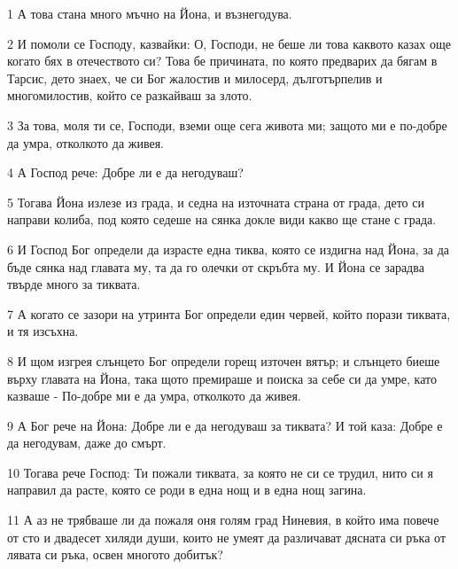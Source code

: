 \par 1 А това стана много мъчно на Йона, и възнегодува.
\par 2 И помоли се Господу, казвайки: О, Господи, не беше ли това каквото казах още когато бях в отечеството си? Това бе причината, по която предварих да бягам в Тарсис, дето знаех, че си Бог жалостив и милосерд, дълготърпелив и многомилостив, който се разкайваш за злото.
\par 3 За това, моля ти се, Господи, вземи още сега живота ми; защото ми е по-добре да умра, отколкото да живея.
\par 4 А Господ рече: Добре ли е да негодуваш?
\par 5 Тогава Йона излезе из града, и седна на източната страна от града, дето си направи колиба, под която седеше на сянка докле види какво ще стане с града.
\par 6 И Господ Бог определи да израсте една тиква, която се издигна над Йона, за да бъде сянка над главата му, та да го олечки от скръбта му. И Йона се зарадва твърде много за тиквата.
\par 7 А когато се зазори на утринта Бог определи един червей, който порази тиквата, и тя изсъхна.
\par 8 И щом изгрея слънцето Бог определи горещ източен вятър; и слънцето биеше върху главата на Йона, така щото премираше и поиска за себе си да умре, като казваше - По-добре ми е да умра, отколкото да живея.
\par 9 А Бог рече на Йона: Добре ли е да негодуваш за тиквата? И той каза: Добре е да негодувам, даже до смърт.
\par 10 Тогава рече Господ: Ти пожали тиквата, за която не си се трудил, нито си я направил да расте, която се роди в една нощ и в една нощ загина.
\par 11 А аз не трябваше ли да пожаля оня голям град Ниневия, в който има повече от сто и двадесет хиляди души, които не умеят да различават дясната си ръка от лявата си ръка, освен многото добитък?

